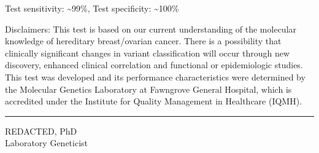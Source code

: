 \documentclass[10pt]{article}
\begin{document}
{Test sensitivity: \textasciitilde 99\%, Test specificity: \textasciitilde 100\%

Disclaimers:  This test is based on our current understanding of the molecular knowledge of hereditary breast/ovarian cancer. There is a possibility that clinically significant changes in variant classification will occur through new discovery, enhanced clinical correlation and functional or epidemiologic studies. This test was developed and its performance characteristics were determined by the Molecular Genetics Laboratory at Fawngrove General Hospital, which is accredited under the Institute for Quality Management in Healthcare (IQMH).
}

\vspace{4em}
\hfill \parbox{7cm}{
\rule{7cm}{1pt}
\small
REDACTED, PhD \\
Laboratory Geneticist
}
\end{document}
